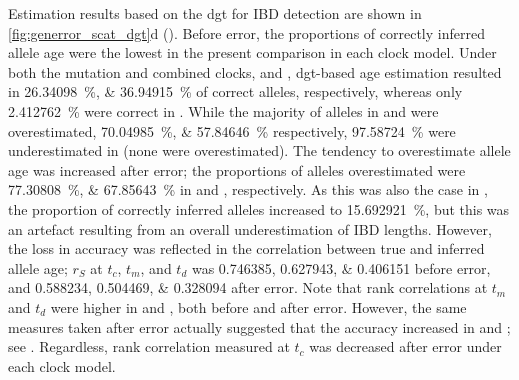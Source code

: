 %

%

Estimation results based on the \gls{dgt} for IBD detection are shown in \cref{fig:generror_scat_dgt}{d} ().
Before error, the proportions of correctly inferred allele age were the lowest in the present comparison in each clock model.
Under both the mutation and combined clocks, \ClockM and \ClockC, \gls{dgt}-based age estimation resulted in \SIlist{26.34098;36.94915}{\percent} of correct alleles, respectively, whereas only \SI{2.412762}{\percent} were correct in \ClockR.
While the majority of alleles in \ClockM and \ClockC were overestimated, \SIlist{70.04985;57.84646}{\percent} respectively, \SI{97.58724}{\percent} were underestimated in \ClockR (none were overestimated).
The tendency to overestimate allele age was increased after error; the proportions of alleles overestimated were \SIlist{77.30808;67.85643}{\percent} in \ClockM and \ClockC, respectively.
As this was also the case in \ClockR, the proportion of correctly inferred alleles increased to \SI{15.692921}{\percent}, but this was an artefact resulting from an overall underestimation of IBD lengths.
However, the loss in accuracy was reflected in the correlation between true and inferred allele age; $r_S$ at $t_c$, $t_m$, and $t_d$ was \numlist{0.746385;0.627943;0.406151} before error, and \numlist{0.588234;0.504469;0.328094} after error.
Note that rank correlations at $t_m$ and $t_d$ were higher in \ClockM and \ClockC, both before and after error.
However, the same measures taken after error actually suggested that the accuracy increased in \ClockM and \ClockC; see .
Regardless, rank correlation measured at $t_c$ was decreased after error under each clock model.

%

%

